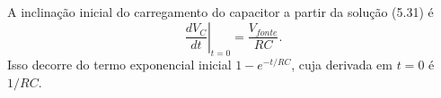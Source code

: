 A inclinação inicial do carregamento do capacitor a partir da solução (5.31) é
\[
\left.\frac{dV_C}{dt}\right|_{t=0} = \frac{V_{fonte}}{RC}.
\]
Isso decorre do termo exponencial inicial $1-e^{-t/RC}$, cuja derivada em $t=0$ é $1/RC$.